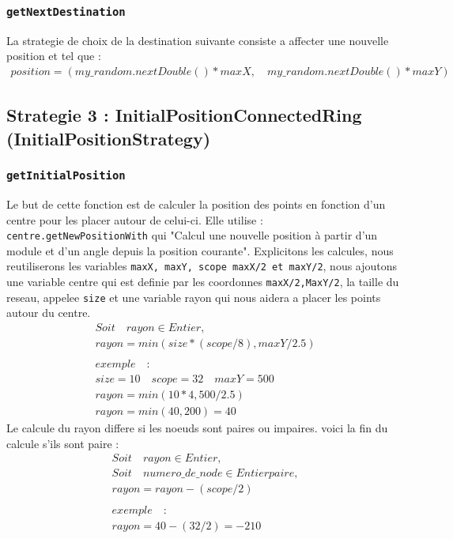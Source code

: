 \documentclass[11pt,a4paper,sans]{report}
\begin{document}
	\subsubsection{\texttt{getNextDestination}}
	\par La strategie de choix de la destination suivante consiste a affecter une nouvelle position  et  tel que :
	\begin{gather}
		position = (my\_random.nextDouble() * maxX, \quad my\_random.nextDouble() * maxY)
	\end{gather}


	\subsection*{Strategie 3 : InitialPositionConnectedRing (InitialPositionStrategy)}
	\subsubsection{\texttt{getInitialPosition}}
	Le but de cette fonction est de calculer la position des points en fonction d'un centre pour les placer autour de celui-ci. Elle utilise : \texttt{centre.getNewPositionWith} qui "Calcul une nouvelle position à partir d'un module et d'un angle depuis la position courante".
	Explicitons les calcules, nous reutiliserons les variables \texttt{maxX, maxY, scope maxX/2 et maxY/2}, nous ajoutons une variable centre qui est definie par les coordonnes \texttt{maxX/2,MaxY/2}, la taille du reseau, appelee \texttt{size} et une variable rayon qui nous aidera a placer les points autour du centre.
	\begin{gather}
		Soit \quad rayon \in Entier, \\
		rayon = min(size*(scope/8), maxY / 2.5) \\
		\\
		exemple \quad : \\ 
		size = 10 \quad scope = 32 \quad maxY = 500 \\
		rayon = min(10*4, 500/2.5) \\
		rayon = min(40, 200) = 40
	\end{gather}
	Le calcule du rayon differe si les noeuds sont paires ou impaires. voici la fin du calcule s'ils sont paire :
	\begin{gather}
		Soit \quad rayon \in Entier, \\
		Soit \quad numero\_de\_node \in Entier paire, \\
		rayon = rayon - (scope/2) \\
		\\
		exemple \quad : \\ 
		rayon = 40 - (32/2) = -210
	\end{gather}
\end{document}
